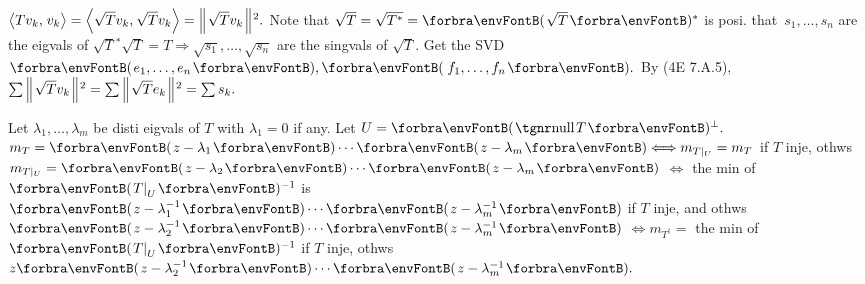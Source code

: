 $\big\langle{}Tv_k,\;\!v_k{}\big\rangle=\Big\langle{}\sqrt{T}v_k,\:\!\sqrt{T}v_k{}\Big\rangle=\Big\Vert\hspace{1pt}{}\sqrt{T}v_k{}\hspace{1pt}\Big\Vert{\hspace{0.5pt}}{^2}.$ Note that $\sqrt{T}=\sqrt{T^*}=\Par{\sqrt{T}}{^*}$ is posi.\parSol{}
\NOTICE that \,$s_1,\dots,s_n$ are the eigvals of $\sqrt{T}{^*}\sqrt{T}=T\Rightarrow\sqrt{s_1},\dots,\sqrt{s_n}$ are the singvals of $\sqrt{T}.$\vspace{1pt}\parSol{}
Get the SVD $\Par{e_1,\dots,e_n},\Par{\,f_1,\dots,f_n}.$ By (4E 7.A.5), $\sum\Big\Vert\hspace{1pt}{}\sqrt{T}v_k{}\hspace{1pt}\Big\Vert{\hspace{0.5pt}}{^2}=\sum\Big\Vert\hspace{1pt}{}\sqrt{T}e_k{}\hspace{1pt}\Big\Vert{\hspace{0.5pt}}{^2}=\sum s_k.$\PfEnd
\SepLine\pagebreak


Let $\lambda_1,\dots,\lambda_m$ be disti eigvals of $T$ with $\lambda_1=0$ if any. Let $U=\Par{\null T}{^\perp}.$\parSol{}
$m_T=\Par{z-\lambda_1}\cdots\Par{z-\lambda_m}\Longleftrightarrow m_{T|_U}=m_T$ if $T$ inje, othws $m_{T|_U}=\Par{z-\lambda_2}\cdots\Par{z-\lambda_m}$\parSol{}
$\Longleftrightarrow$ the min of $\Par{T\mmid_U}{^{-1}}$ is $\Par{z-\lambda_1^{-1}}\cdots\Par{z-\lambda_m^{-1}}$ if $T$ inje, and othws $\Par{z-\lambda_2^{-1}}\cdots\Par{z-\lambda_m^{-1}}$\parSol{}
$\Longleftrightarrow m_{T^\dagger}=$ the min of $\Par{T\mmid_U}{^{-1}}$ if $T$ inje, othws $z\Par{z-\lambda_2^{-1}}\cdots\Par{z-\lambda_m^{-1}}.$\PfEnd
\SepLine

